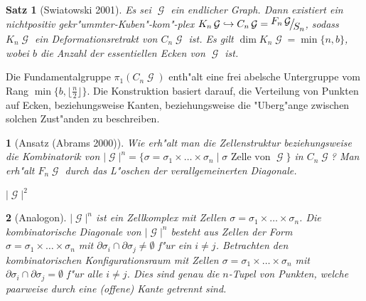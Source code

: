 \documentclass[paper=A4, twoside, chapterprefix=true, bibliography=totoc, headsepline]{scrbook}
\newcommand{\tikzgitter}[3][0.25]{ %
	\draw[step=#1,gray!15] #2 grid #3;
	\draw[step=2*#1,gray!30] #2 grid #3;
	\fill (0,0) circle(0.1); 
}
\DeclareMathOperator{\calG}{{\mathcal{G}}}
\newcommand{\G}{\calG}
\newcommand{\X}{\times}
\newcommand{\FakRaum}[2]{
	\raisebox{0.7ex}{\ensuremath{#1}}
	\ensuremath{\mkern-3mu}\big/\ensuremath{\mkern-3mu}
	\raisebox{-0.6ex}{\ensuremath{#2}}}
\theoremstyle{break}
\theoremstyle{nonumberbreak}
\newtheorem{satz}{Satz}
\theoremstyle{emptybreak}
\newtheorem{emptythm}{}%
\theoremstyle{break}
\newcommand{\quot}[1]{\textrm{\glqq}{#1}\textrm{\grqq}}
\begin{document}
\begin{satz}[Swiatowski 2001]
Es sei $\G$ ein endlicher Graph.
Dann existiert ein nichtpositiv gekr"ummter-Kuben"-kom"-plex $K_n\G \hookrightarrow C_n\G = \FakRaum{F_n\calG}{S_n}$, sodass $K_n\calG$ ein Deformationsretrakt von $C_n\G$ ist.
Es gilt $\dim K_n\calG = \min \{n, b\}$, wobei $b$ die Anzahl der essentiellen Ecken von $\G$ ist.
\end{satz}


Die Fundamentalgruppe $\pi_1(C_n\G)$ enth"alt eine frei abelsche Untergruppe vom Rang $\min\{b, \lfloor \frac{n}{2} \rfloor\}$.
Die Konstruktion basiert darauf, die Verteilung von Punkten auf Ecken, beziehungsweise Kanten, beziehungsweise die "Uberg"ange zwischen solchen Zust"anden zu beschreiben.

\begin{emptythm}[Ansatz (Abrams 2000)]
Wie erh"alt man die Zellenstruktur beziehungsweise die Kombinatorik von $|\G|^n = \{ \sigma = \sigma_1 \X \ldots \X \sigma_n \mid \sigma \text{ Zelle von } \G \}$ in $C_n\G$?
Man erh"alt $F_n\G$ durch das \quot{L"oschen} der verallgemeinerten Diagonale.
\begin{center} $|\G|^2$\end{center}
\end{emptythm}

\begin{emptythm}[Analogon]
$|\G|^n$ ist ein Zellkomplex mit Zellen $\sigma = \sigma_1 \X \ldots \X \sigma_n$.
Die kombinatorische Diagonale von $|\G|^n$ besteht aus Zellen der Form $\sigma = \sigma_1 \X \ldots \X \sigma_n$ mit $\partial\sigma_i \cap \partial\sigma_j \ne \emptyset$ f"ur ein $i \ne j$.
Betrachten den kombinatorischen Konfigurationsraum mit Zellen $\sigma = \sigma_1 \X \ldots \X \sigma_n$ mit $\partial\sigma_i \cap \partial\sigma_j = \emptyset$ f"ur alle $i \ne j$.
Dies sind genau die $n$-Tupel von Punkten, welche paarweise durch eine (offene) Kante getrennt sind.
\end{emptythm}
\end{document}
